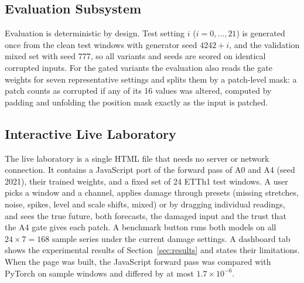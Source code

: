 \begin{table}[!t]
\centering
\caption{Tensor Shapes in One Forward Pass}
\label{tab:shapes}
\footnotesize
{}
\end{table}

\subsection{Evaluation Subsystem}

Evaluation is deterministic by design. Test setting $i$ ($i=0,\dots,21$) is generated once from the clean test windows with generator seed $4242+i$, and the validation mixed set with seed 777, so all variants and seeds are scored on identical corrupted inputs. For the gated variants the evaluation also reads the gate weights for seven representative settings and splits them by a patch-level mask: a patch counts as corrupted if any of its 16 values was altered, computed by padding and unfolding the position mask exactly as the input is patched.

\subsection{Interactive Live Laboratory}

The live laboratory is a single HTML file that needs no server or network connection. It contains a JavaScript port of the forward pass of A0 and A4 (seed 2021), their trained weights, and a fixed set of 24 ETTh1 test windows. A user picks a window and a channel, applies damage through presets (missing stretches, noise, spikes, level and scale shifts, mixed) or by dragging individual readings, and sees the true future, both forecasts, the damaged input and the trust that the A4 gate gives each patch. A benchmark button runs both models on all $24\times7=168$ sample series under the current damage settings. A dashboard tab shows the experimental results of Section~\ref{sec:results} and states their limitations. When the page was built, the JavaScript forward pass was compared with PyTorch on sample windows and differed by at most $1.7\times10^{-6}$.
